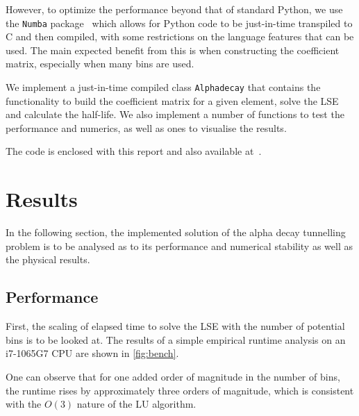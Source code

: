 \documentclass[a4paper,DIV=12,english]{scrartcl}
\begin{document}
However, to optimize the performance beyond that of standard Python, we use the \texttt{Numba} package~\cite{numba} which allows for Python code to be just-in-time transpiled to C and then compiled, with some restrictions on the language features that can be used. The main expected benefit from this is when constructing the coefficient matrix, especially when many bins are used.

We implement a just-in-time compiled class \texttt{Alphadecay} that contains the functionality to build the coefficient matrix for a given element, solve the LSE and calculate the half-life. We also implement a number of functions to test the performance and numerics, as well as ones to visualise the results.

The code is enclosed with this report and also available at~\cite{github}.

\section{Results}
In the following section, the implemented solution of the alpha decay tunnelling problem is to be analysed as to its performance and numerical stability as well as the physical results.

\subsection{Performance}
First, the scaling of elapsed time to solve the LSE with the number of potential bins is to be looked at. The results of a simple empirical runtime analysis on an i7-1065G7 CPU are shown in \ref{fig:bench}. 

One can observe that for one added order of magnitude in the number of bins, the runtime rises by approximately three orders of magnitude, which is consistent with the $O(3)$ nature of the LU algorithm. 
\end{document}

